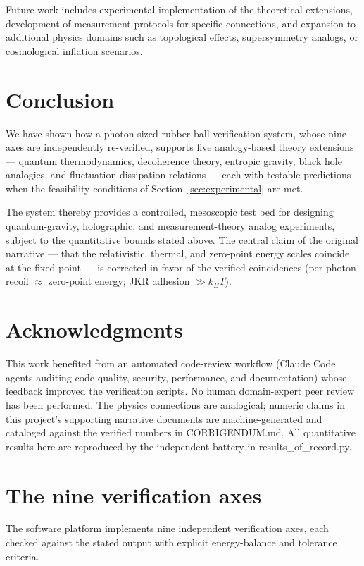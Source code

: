 \documentclass[12pt,twoside]{article}
\begin{document}
Future work includes experimental implementation of the theoretical extensions, development of measurement protocols for specific connections, and expansion to additional physics domains such as topological effects, supersymmetry analogs, or cosmological inflation scenarios.

\section{Conclusion}
We have shown how a photon-sized rubber ball verification system, whose nine axes are independently re-verified, supports five analogy-based theory extensions — quantum thermodynamics, decoherence theory, entropic gravity, black hole analogies, and fluctuation-dissipation relations — each with testable predictions when the feasibility conditions of Section~\ref{sec:experimental} are met.

The system thereby provides a controlled, mesoscopic test bed for designing quantum-gravity, holographic, and measurement-theory analog experiments, subject to the quantitative bounds stated above. The central claim of the original narrative — that the relativistic, thermal, and zero-point energy scales coincide at the fixed point — is corrected in favor of the verified coincidences (per-photon recoil $\approx$ zero-point energy; JKR adhesion $\gg k_BT$).

\section*{Acknowledgments}
This work benefited from an automated code-review workflow (Claude Code agents auditing code quality, security, performance, and documentation) whose feedback improved the verification scripts. No human domain-expert peer review has been performed. The physics connections are analogical; numeric claims in this project's supporting narrative documents are machine-generated and cataloged against the verified numbers in CORRIGENDUM.md. All quantitative results here are reproduced by the independent battery in results\_of\_record.py.

\appendix
\section{The nine verification axes}
The software platform implements nine independent verification axes, each
checked against the stated output with explicit energy-balance and tolerance
criteria.
\end{document}
